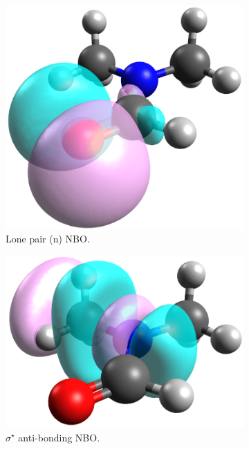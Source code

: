 \begin{refsection}
\begin{figure}
    \begin{subfigure}{0.3\linewidth}
        \includegraphics[width=\linewidth]{Figures/dmfnbo-n.png}
        \caption{Lone pair (n) NBO.}
    \end{subfigure}
    \begin{subfigure}{0.3\linewidth}
        \includegraphics[width=\linewidth]{Figures/dmfnbo-sigmastar.png}
        \caption{$ \sigma^{\star} $ anti-bonding NBO.}
    \end{subfigure}
    \begin{subfigure}{0.3\linewidth}

\end{subfigure}
\end{figure}
\end{refsection}

